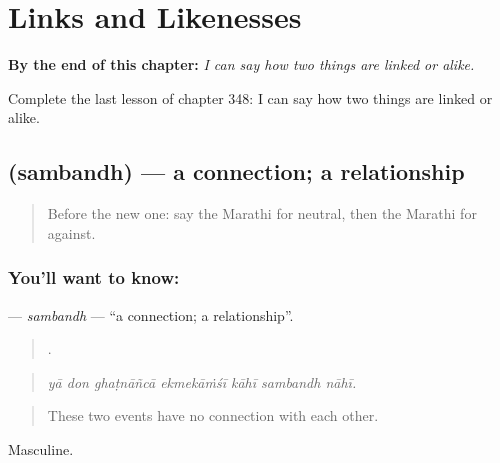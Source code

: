 
\chapter{Links and Likenesses}
\label{ch:mr-links-and-likenesses}

\begin{chapteropening}
\textbf{By the end of this chapter:} \emph{I can say how two things are linked or alike.}

Complete the last lesson of chapter 348: I can say how two things are linked or alike.
\end{chapteropening}

\section[\texorpdfstring{\mr{संबंध} (sambandh)}{संबंध (sambandh)}]{ (sambandh) — a connection; a relationship}

\label{lesson:MR-C348-sambandh}



\begin{quote}
Before the new one: say the Marathi for neutral, then the Marathi for against.
\end{quote}

\subsection*{You'll want to know: }
\textbf{} — \emph{sambandh} — \textquotedblleft{}a connection; a relationship\textquotedblright{}.

\begin{quote}
      .
\end{quote}

\begin{quote}
\emph{yā don ghaṭnāñcā ekmekāṁśī kāhī sambandh nāhī.}
\end{quote}

\begin{quote}
These two events have no connection with each other.
\end{quote}

Masculine.

